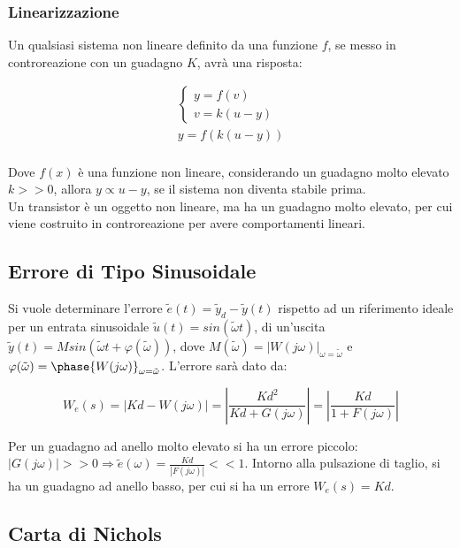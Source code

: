 \documentclass{article}
\numberwithin{equation}{subsection}
\begin{document}
\subsubsection{Linearizzazione}

Un qualsiasi sistema non lineare definito da una funzione $f$, se messo in controreazione con un guadagno $K$, avrà una risposta: 

\begin{gather}
    \begin{cases}
        y=f(v)\\
        v=k(u-y)
    \end{cases}\\
    y=f(k(u-y))\\
\end{gather}

Dove $f(x)$ è una funzione non lineare, considerando un guadagno molto elevato $k>>0$, allora $y\propto u-y$, se il sistema non diventa stabile prima. \\
Un transistor è un oggetto non lineare, ma ha un guadagno molto elevato, per cui viene costruito in controreazione per avere comportamenti lineari. 

\subsection{Errore di Tipo Sinusoidale}

Si vuole determinare l'errore $\tilde{e}(t)=\tilde{y}_d-\tilde{y}(t)$ rispetto ad un riferimento ideale per un entrata sinusoidale $\tilde{u}(t)=sin(\tilde{\omega}t)$, di un'uscita 
$\tilde{y}(t)=Msin(\tilde{\omega}t+{\varphi}(\tilde{\omega}))$, dove $M(\tilde{\omega})=|W(j\omega)|_{\omega=\tilde{\omega}}$ e 
$\varphi(\tilde{\omega})=\phase{W(j\omega)}_{\omega=\tilde{\omega}}$. 
L'errore sarà dato da:

\begin{equation}
    W_e(s)=|Kd-W(j\omega)|=\left|\displaystyle\frac{Kd^2}{Kd+G(j\omega)}\right|=\left|\frac{Kd}{1+F(j\omega)}\right|
\end{equation}

Per un guadagno ad anello molto elevato si ha un errore piccolo: 
$|G(j\omega)|>>0\Rightarrow \tilde{e}(\omega)=\displaystyle\frac{Kd}{|F(j\omega)|}<<1$. Intorno alla pulsazione di taglio, si ha un guadagno ad anello basso, per cui si ha un errore 
$W_e(s)=Kd$. \\

\subsection{Carta di Nichols}
\end{document}
